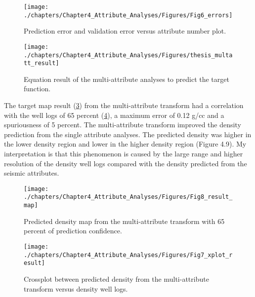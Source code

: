 	
	
\begin{figure}[hbtp]
	\begin{center}
	\texttt{[image: ./chapters/Chapter4\_Attribute\_Analyses/Figures/Fig6\_errors]}
			\caption[Prediction error and validation error versus attribute number plot.]{Prediction error and validation error versus attribute number plot.}
			\label{fig:errors}
		\end{center}
	\end{figure}	
	
	
	
\begin{figure}[hbtp]
	\begin{center}
	\texttt{[image: ./chapters/Chapter4\_Attribute\_Analyses/Figures/thesis\_multatt\_result]}
			\caption[Equation result of the multi-attribute analyses to predict the target function.]{Equation result of the multi-attribute analyses to predict the target function.}
			\label{fig:result}
		\end{center}
	\end{figure}	
	
	
	

	

	The target map result (\ref{fig:result_map}) from the multi-attribute transform had a correlation with the well logs of 65 percent (\ref{fig:xplot_result}), a maximum error of 0.12 g/cc and a spuriousness of 5 percent. The multi-attribute transform improved the density prediction from the single attribute analyses. The predicted density was higher in the lower density region and lower in the higher density region (Figure 4.9). My interpretation is that this phenomenon is caused by the large range and higher resolution of the density well logs compared with the density predicted from the seismic attributes.
	
	
\begin{figure}[hbtp]
	\begin{center}
	\texttt{[image: ./chapters/Chapter4\_Attribute\_Analyses/Figures/Fig8\_result\_map]}
			\caption[Predicted density map from the multi-attribute transform.]{Predicted density map from the multi-attribute transform with 65 percent of prediction confidence.}
			\label{fig:result_map}
		\end{center}
	\end{figure}	

	


\begin{figure}[hbtp]
	\begin{center}
	\texttt{[image: ./chapters/Chapter4\_Attribute\_Analyses/Figures/Fig7\_xplot\_result]}
			\caption[Crossplot between predicted density from the multi-attribute transform versus density well logs.]{Crossplot between predicted density from the multi-attribute transform versus density well logs.}
			\label{fig:xplot_result}
		\end{center}
	\end{figure}	







